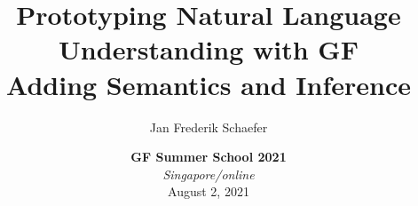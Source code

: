 \documentclass[aspectratio=169]{beamer}
\title{Prototyping Natural Language Understanding with GF \\ \large  Adding Semantics and Inference}
\author{Jan Frederik Schaefer}
\institute{FAU Erlangen-N\"urnberg}
\date{\textbf{GF Summer School 2021} \\ \textit{Singapore/online} \\ August 2, 2021 }
\begin{document}
\frame\titlepage




\end{document}
